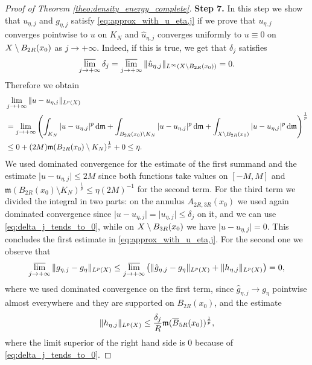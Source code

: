 \documentclass[12pt]{amsart}
\renewcommand{\d}{{\mathrm d}}
\newcommand{\lims}{\varlimsup}
\newcommand{\X}{{\rm X}}
\newcommand{\mm}{\mathfrak m}
\theoremstyle{definition}
\begin{document}
\begin{proof}[Proof of Theorem \ref{theo:density_energy_complete}]
        \textbf{Step 7.} In this step we show that $u_{\eta,j}$ and $g_{\eta,j}$ satisfy \eqref{eq:approx_with_u_eta,j} if we prove that $u_{\eta,j}$ converges pointwise to $u$ on $K_N$ and $\hat{u}_{\eta,j}$ converges uniformly to $u \equiv 0$ on $\X \setminus B_{2R}(x_0)$ as $j\to +\infty$.
        Indeed, if this is true, we get that $\delta_j$ satisfies
        \begin{equation}
        \label{eq:delta_j_tends_to_0}
            \lims_{j\to +\infty} \delta_j = \lims_{j \to +\infty} \|\hat{u}_{\eta,j}\|_{L^\infty(\X\setminus B_{2 R}(x_0))}= 0.
        \end{equation}
        Therefore we obtain
        \begin{equation}
            \begin{aligned}
                &\lim_{j\to +\infty} \Vert u - u_{\eta,j} \Vert_{L^p(\X)}  \\
                &=\lim_{j\to +\infty}\left(\int_{K_N} \vert u - u_{\eta,j} \vert^p \,\d\mm + \int_{B_{2R}(x_0)\setminus K_N} \vert u - u_{\eta,j} \vert^p \,\d\mm + \int_{\X \setminus B_{2R}(x_0)} \vert u - u_{\eta,j} \vert^p \,\d\mm \right)^{\frac{1}{p}} \\
                &\le 0 + (2M)\mm(B_{2R}(x_0) \setminus K_N)^{\frac{1}{p}} + 0 \le \eta.
            \end{aligned}
        \end{equation}
        We used dominated convergence for the estimate of the first summand and the estimate $\vert u - u_{\eta,j} \vert \le 2M$ since both functions take values on $[-M,M]$ and $\mm(B_{2R}(x_0) \setminus K_N)^{\frac{1}{p}} \le \eta (2M)^{-1}$ for the second term. For the third term we divided the integral in two parts: on the annulus $A_{2R,3R}(x_0)$ we used again dominated convergence since $\vert u-u_{\eta,j} \vert = \vert u_{\eta,j}\vert \le \delta_j$ on it, and we can use \eqref{eq:delta_j_tends_to_0}, while on $\X \setminus B_{3R}(x_0)$ we have $\vert u - u_{\eta,j} \vert = 0$.
        This concludes the first estimate in \eqref{eq:approx_with_u_eta,j}. For the second one we observe that
        \begin{equation}
            \lims_{j\to +\infty} \Vert g_{\eta,j} - g_\eta \Vert_{L^p(\X)} \le \lims_{j\to +\infty} \left( \Vert \hat{g}_{\eta,j} - g_\eta \Vert_{L^p(\X)} + \Vert h_{\eta,j} \Vert_{L^p(\X)}\right) = 0,
        \end{equation}
        where we used dominated convergence on the first term, since $\hat{g}_{\eta,j} \to g_\eta$ pointwise almost everywhere and they are supported on $B_{2R}(x_0)$, and the estimate
        $$\Vert h_{\eta,j} \Vert_{L^p(\X)} \le \frac{\delta_j}{R} \mm(\overline{B}_{5R}(x_0))^{\frac{1}{p}},$$
        where the limit superior of the right hand side is $0$ because of \eqref{eq:delta_j_tends_to_0}.
    \vspace{2mm}


\end{proof}
\end{document}
